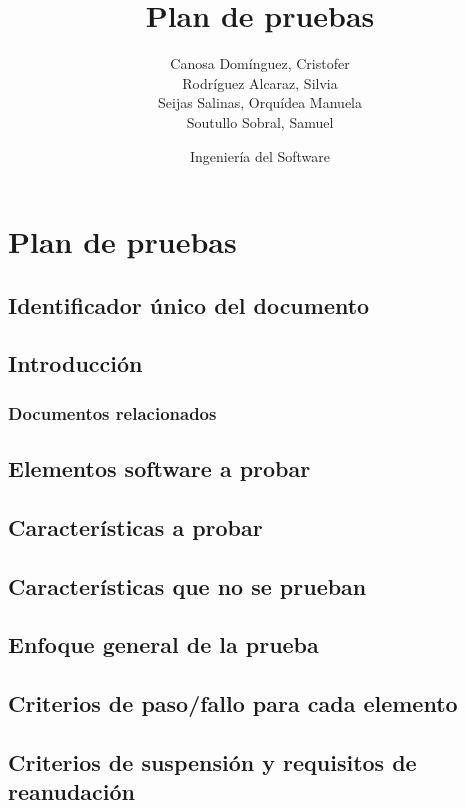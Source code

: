 \documentclass[10pt,a4paper]{article}
\title{Plan de pruebas}
\author{Canosa Domínguez, Cristofer \\ Rodríguez Alcaraz, Silvia \\ Seijas Salinas, Orquídea Manuela \\ Soutullo Sobral, Samuel}
\date{Ingeniería del Software}
\begin{document}
	\maketitle
	\newpage
	\tableofcontents
	\newpage
	
\section{Plan de pruebas}
	\subsection{Identificador único del documento}

	\subsection{Introducción}
			\subsubsection{Documentos relacionados}

	\subsection{Elementos software a probar}

	\subsection{Características a probar}

	\subsection{Características que no se prueban}

	\subsection{Enfoque general de la prueba}

	\subsection{Criterios de paso/fallo para cada elemento}

	\subsection{Criterios de suspensión y requisitos de reanudación}
\end{document}
